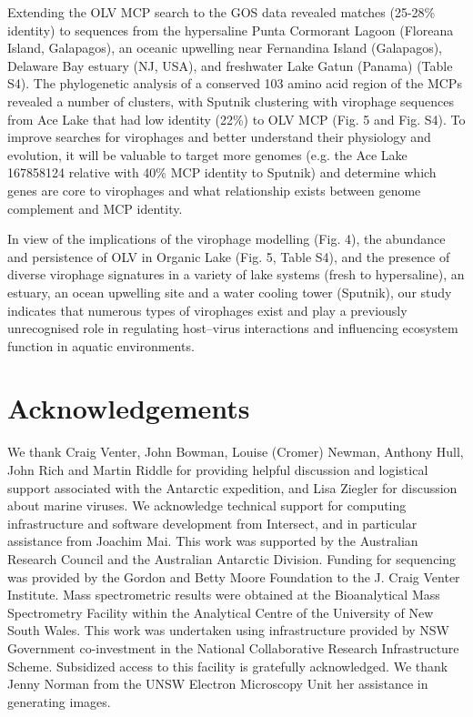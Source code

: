Extending the OLV MCP search to the GOS data revealed matches (25-28\% identity) to sequences from the hypersaline Punta Cormorant Lagoon (Floreana Island, Galapagos), an oceanic upwelling near Fernandina Island (Galapagos), Delaware Bay estuary (NJ, USA), and freshwater Lake Gatun (Panama) (Table S4). The phylogenetic analysis of a conserved 103 amino acid region of the MCPs revealed a number of clusters, with Sputnik clustering with virophage sequences from Ace Lake that had low identity (22\%) to OLV MCP (Fig. 5 and Fig. S4). 
To improve searches for virophages and better understand their physiology and evolution, it will be valuable to target more genomes (e.g. the Ace Lake 167858124 relative with 40\% MCP identity to Sputnik) and determine which genes are core to virophages and what relationship exists between genome complement and MCP identity.
 
In view of the implications of the virophage modelling (Fig. 4), the abundance and persistence of OLV in Organic Lake (Fig. 5, Table S4), and the presence of diverse virophage signatures in a variety of lake systems (fresh to hypersaline), an estuary, an ocean upwelling site and a water cooling tower (Sputnik), our study indicates that numerous types of virophages exist and play a previously unrecognised role in regulating host--virus interactions and influencing ecosystem function in aquatic environments. 


\section{Acknowledgements}
We thank Craig Venter, John Bowman, Louise (Cromer) Newman, Anthony Hull, John Rich and Martin Riddle for providing helpful discussion and logistical support associated with the Antarctic expedition, and Lisa Ziegler for discussion about marine viruses. 
We acknowledge technical support for computing infrastructure and software development from Intersect, and in particular assistance from Joachim Mai. 
This work was supported by the Australian Research Council and the Australian Antarctic Division. 
Funding for sequencing was provided by the Gordon and Betty Moore Foundation to the J. Craig Venter Institute. 
Mass spectrometric results were obtained at the Bioanalytical Mass Spectrometry Facility within the Analytical Centre of the University of New South Wales. 
This work was undertaken using infrastructure provided by NSW Government co-investment in the National Collaborative Research Infrastructure Scheme. 
Subsidized access to this facility is gratefully acknowledged. 
We thank Jenny Norman from the UNSW Electron Microscopy Unit her assistance in generating images. 
